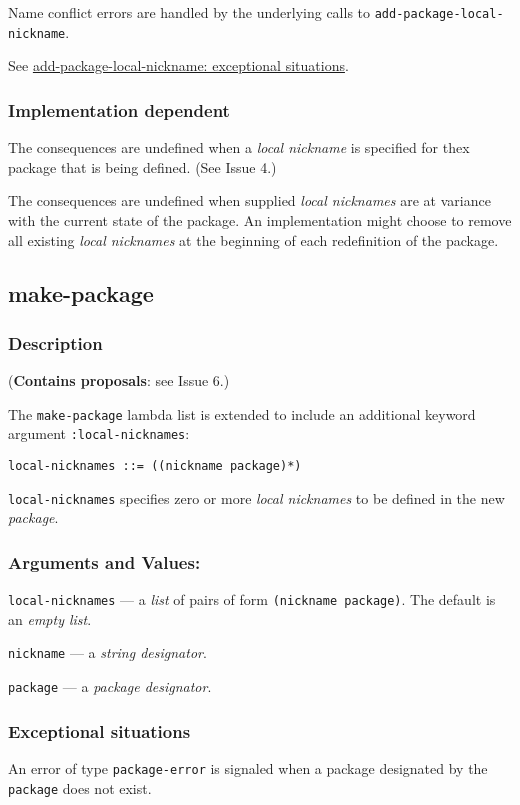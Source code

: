 \documentclass[11pt]{article}
\begin{document}
Name conflict errors are handled by the underlying calls to
\texttt{add-package-local-nickname}.

See \hyperref[sec:orgdcd5ecd]{add-package-local-nickname: exceptional situations}.
\subsubsection{Implementation dependent}
\label{sec:org6f8fe2a}
The consequences are undefined when a \emph{local nickname} is specified for thex
package that is being defined. (See Issue 4.)

The consequences are undefined when supplied \emph{local nicknames} are at variance
with the current state of the package. An implementation might choose to remove
all existing \emph{local nicknames} at the beginning of each redefinition of the
package.
\subsection{make-package}
\label{sec:orgf3a0730}
\subsubsection{Description}
\label{sec:org8581069}
(\textbf{Contains proposals}: see Issue 6.)

The \texttt{make-package} lambda list is extended to include an additional keyword
argument \texttt{:local-nicknames}:
\begin{verbatim}
local-nicknames ::= ((nickname package)*)
\end{verbatim}


\texttt{local-nicknames} specifies zero or more \emph{local nicknames} to be defined in the
new \emph{package}.
\subsubsection{Arguments and Values:}
\label{sec:orgc7abff5}
\texttt{local-nicknames} --- a \emph{list} of pairs of form \texttt{(nickname package)}.
The default is an \emph{empty list}.

\texttt{nickname} --- a \emph{string designator}.

\texttt{package} --- a \emph{package designator}.
\subsubsection{Exceptional situations}
\label{sec:org4d7c11f}
An error of type \texttt{package-error} is signaled when a package designated by the
\texttt{package} does not exist.
\end{document}

